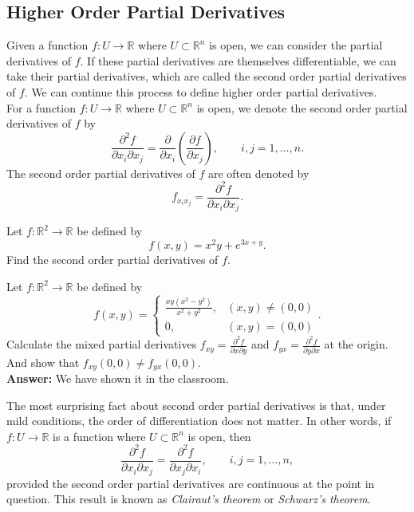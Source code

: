 \subsection{Higher Order Partial Derivatives}
Given a function \(f : U \to \mathbb{R}\) where \(U \subset \mathbb{R}^n\) is open, we can consider the partial derivatives of \(f\). If these partial derivatives are themselves differentiable, we can take their partial derivatives, which are called the second order partial derivatives of \(f\). We can continue this process to define higher order partial derivatives.\\
For a function \(f : U \to \mathbb{R}\) where \(U\subset \mathbb{R}^n\) is open, we denote the second order partial derivatives of \(f\) by
\[  
\frac{\partial^2 f}{\partial x_i \partial x_j}
=
\frac{\partial}{\partial x_i}\left(\frac{\partial f}{\partial
x_j}\right),
\qquad
i, j = 1, \ldots, n.
\]
The second order partial derivatives of \(f\) are often denoted by
\[
f_{x_i x_j}
=
\frac{\partial^2 f}{\partial x_i \partial x_j}.
\]
\begin{example}
    Let \(f : \mathbb{R}^2 \to \mathbb{R}\) be defined by
\[
f(x,y) = x^2y + e^{3x+y}.
\]
Find the second order partial derivatives of \(f\).
\end{example}
\begin{example}
    Let \(f : \mathbb{R}^2 \to \mathbb{R}\) be defined by
\[
f(x,y) = \begin{cases}
\frac{xy(x^2-y^2)}{x^2+y^2}, & (x,y) \neq (0,0)\\
0, & (x,y) = (0,0)
\end{cases}.
\]
Calculate the mixed partial derivatives $f_{xy}=\frac{\partial^2 f}{\partial x \partial y}$ and $f_{yx}=\frac{\partial^2 f}{\partial y \partial x}$ at the origin.
And show that $f_{xy}(0,0) \neq f_{yx}(0,0)$.\\
\textbf{Answer:} We have shown it in the classroom.
\end{example}
The most surprising fact about second order partial derivatives is that, under mild conditions, the order of differentiation does not matter. In other words, if \(f : U \to \mathbb{R}\) is a function where \(U \subset \mathbb{R}^n\) is open, then
\[
\frac{\partial^2 f}{\partial x_i \partial x_j}
=
\frac{\partial^2 f}{\partial x_j \partial x_i},
\qquad
i, j = 1, \ldots, n,
\]
provided the second order partial derivatives are continuous at the point in question. This result is known as \emph{Clairaut's theorem} or \emph{Schwarz's theorem}.

